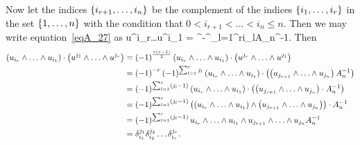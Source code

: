 Now let the indices $\left \{ {i_{r+1},\dots,i_{n}} \right \}$ be the complement of the indices $\left \{ {i_{1},\dots,i_{r}} \right \}$ in the set $\left \{ {1,\dots,n} \right \}$ with the condition that
$0<i_{r+1}<\dots<i_{n}\le n$.  Then we may write equation~\ref{eqA_27} as
\be
	u^{i_{r}}\W\dots\W u^{i_{1}} = ^{-}^{\sum_{l=1}^{r}i_{l}}A_{n}^{-1}.
\ee
Then
\begin{align}
	\paren{u_{i_{r}}\W\dots\W u_{i_{1}}}\cdot\paren{u^{j_{1}}\W\dots\W u^{j_{r}}} &= \paren{-1}^{\frac{r\paren{r-1}}{2}}
	                                                                                 \paren{u_{i_{r}}\W\dots\W u_{i_{1}}}\cdot\paren{u^{j_{r}}\W\dots\W u^{j_{1}}} \nn \\
	                                                                              &= \paren{-1}^{-r}\paren{-1}^{\sum_{l=1}^{r}j_{l}}
	                                                                                 \paren{u_{i_{r}}\W\dots\W u_{i_{1}}}\cdot
	                                                                                 \paren{\paren{u_{j_{r+1}}\W\dots\W u_{j_{n}}}A_{n}^{-1}} \nn \\
	                                                                              &= \paren{-1}^{\sum_{l=1}^{r}\paren{j_{l}-1}}
	                                                                                 \paren{u_{i_{r}}\W\dots\W u_{i_{1}}}\cdot
	                                                                                 \paren{\paren{u_{j_{r+1}}\W\dots\W u_{j_{n}}}\cdot A_{n}^{-1}}	\nn \\
	                                                                              &= \paren{-1}^{\sum_{l=1}^{r}\paren{j_{l}-1}}
	                                                                                 \paren{\paren{u_{i_{r}}\W\dots\W u_{i_{1}}}\W
	                                                                                 \paren{u_{j_{r+1}}\W\dots\W u_{j_{n}}}}\cdot A_{n}^{-1} \nn \\
	                                                                              &= \paren{-1}^{\sum_{l=1}^{r}\paren{j_{l}-1}}
	                                                                                 u_{i_{r}}\W\dots\W u_{i_{1}}\W
	                                                                                 u_{j_{r+1}}\W\dots\W u_{j_{n}}A_{n}^{-1} \label{eqA_29}\\
	                                                                              &= \delta_{i_{1}}^{j_{1}}\delta_{i_{2}}^{j_{2}}\dots\delta_{i_{r}}^{j_{r}} \label{eqA_30}.
\end{align}
